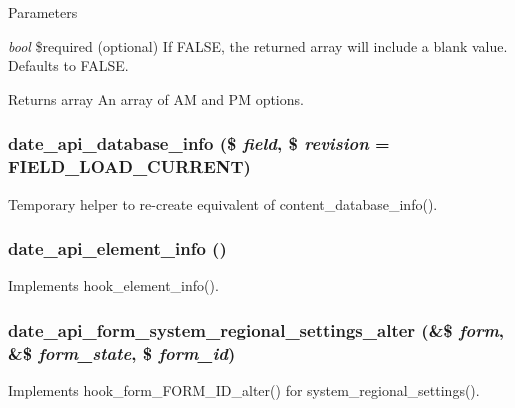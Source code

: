 \begin{DoxyParams}{Parameters}
\item[{\em bool}]\$required (optional) If FALSE, the returned array will include a blank value. Defaults to FALSE.\end{DoxyParams}
\begin{DoxyReturn}{Returns}
array An array of AM and PM options. 
\end{DoxyReturn}
\hypertarget{date__api_8module_a53245efe16c2d5ae6063e784952ef164}{
\subsubsection[{date\_\-api\_\-database\_\-info}]{\setlength{\rightskip}{0pt plus 5cm}date\_\-api\_\-database\_\-info (\$ {\em field}, \/  \$ {\em revision} = {\ttfamily FIELD\_\-LOAD\_\-CURRENT})}}
\label{date__api_8module_a53245efe16c2d5ae6063e784952ef164}
Temporary helper to re-\/create equivalent of content\_\-database\_\-info(). \hypertarget{date__api_8module_a6b1b048f77260adfcab2add33ded37ec}{
\subsubsection[{date\_\-api\_\-element\_\-info}]{\setlength{\rightskip}{0pt plus 5cm}date\_\-api\_\-element\_\-info ()}}
\label{date__api_8module_a6b1b048f77260adfcab2add33ded37ec}
Implements hook\_\-element\_\-info(). \hypertarget{date__api_8module_acbea03931dc33c56ac72db2c8042f7a5}{
\subsubsection[{date\_\-api\_\-form\_\-system\_\-regional\_\-settings\_\-alter}]{\setlength{\rightskip}{0pt plus 5cm}date\_\-api\_\-form\_\-system\_\-regional\_\-settings\_\-alter (\&\$ {\em form}, \/  \&\$ {\em form\_\-state}, \/  \$ {\em form\_\-id})}}
\label{date__api_8module_acbea03931dc33c56ac72db2c8042f7a5}
Implements hook\_\-form\_\-FORM\_\-ID\_\-alter() for system\_\-regional\_\-settings().


